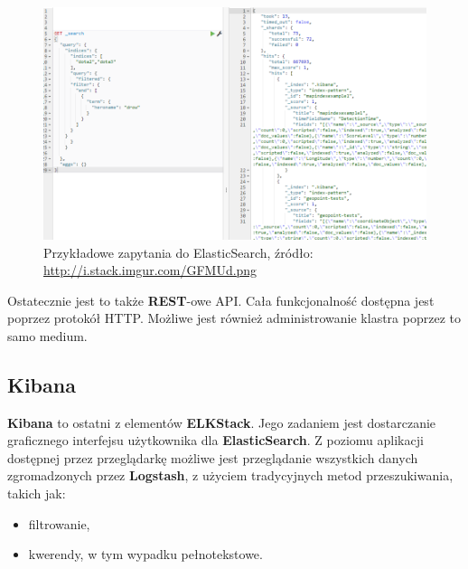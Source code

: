    \begin{figure}[h]
        \centering
        \includegraphics[width=1.0\textwidth]{images/es_query}
        \caption[Przykładowe zapytania do ElasticSearch]{
            Przykładowe zapytania do ElasticSearch, źródło: \url{http://i.stack.imgur.com/GFMUd.png}
        }
        \label{chapter:application:elkstack:es:query}
    \end{figure}
    Ostatecznie jest to także \textbf{REST}-owe API. Cała funkcjonalność dostępna jest poprzez
    protokół HTTP. Możliwe jest również administrowanie klastra poprzez to samo medium.

\clearpage

\subsection{Kibana}
\label{chapter:application:elkstack:kibana}

    \textbf{Kibana} to ostatni z elementów \textbf{ELKStack}. Jego zadaniem jest dostarczanie graficznego interfejsu
    użytkownika dla \textbf{ElasticSearch}. Z poziomu aplikacji dostępnej przez przeglądarkę możliwe
    jest przeglądanie wszystkich danych zgromadzonych przez \textbf{Logstash}, z użyciem tradycyjnych
    metod przeszukiwania, takich jak:
    \begin{itemize}
        \item filtrowanie,
        \item kwerendy, w tym wypadku pełnotekstowe.
    \end{itemize}
    
